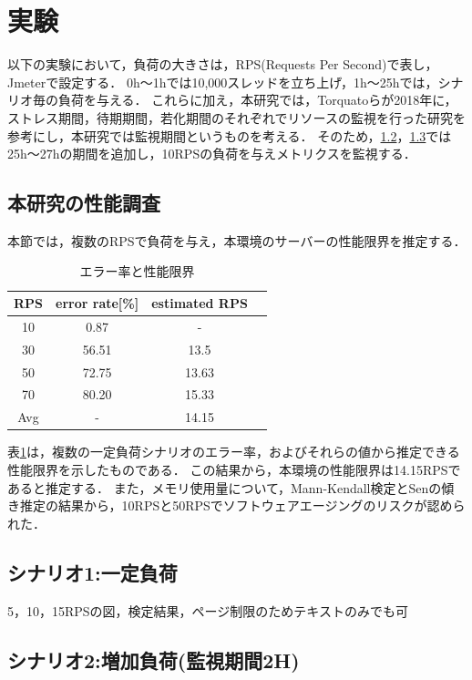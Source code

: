 \documentclass[twoside,twocolumn,10pt]{jarticle}  %
\begin{document}
\section{実験}
以下の実験において，負荷の大きさは，RPS(Requests Per Second)で表し，Jmeterで設定する．
0h～1hでは10,000スレッドを立ち上げ，1h～25hでは，シナリオ毎の負荷を与える．
これらに加え，本研究では，Torquatoらが2018年に，ストレス期間，待期期間，若化期間のそれぞれでリソースの監視を行った研究を参考にし，本研究では監視期間というものを考える．
そのため，\ref{subsec:load1}，\ref{subsec:load2}では25h～27hの期間を追加し，10RPSの負荷を与えメトリクスを監視する．
\subsection{本研究の性能調査}\label{subsec:limit}
本節では，複数のRPSで負荷を与え，本環境のサーバーの性能限界を推定する．
\begin{table}[h]
  \centering
  \caption{エラー率と性能限界}
  \label{tab:rps}
  \begin{tabular}{cccc}
    \hline \hline
    RPS & error rate[\%] & estimated RPS \\ \hline
    10 & 0.87 & - \\ \hline
    30 & 56.51 & 13.5 \\ \hline
    50 & 72.75 & 13.63 \\ \hline
    70 & 80.20 & 15.33 \\ \hline \hline
    Avg & - & 14.15 \\ \hline
  \end{tabular}
\end{table}

表\ref{tab:rps}は，複数の一定負荷シナリオのエラー率，およびそれらの値から推定できる性能限界を示したものである．
この結果から，本環境の性能限界は14.15RPSであると推定する．
また，メモリ使用量について，Mann-Kendall検定とSenの傾き推定の結果から，10RPSと50RPSでソフトウェアエージングのリスクが認められた．\par

\subsection{シナリオ1:一定負荷}\label{subsec:load1}
5，10，15RPSの図，検定結果，ページ制限のためテキストのみでも可

\subsection{シナリオ2:増加負荷(監視期間2H)}\label{subsec:load2} 
\end{document}
